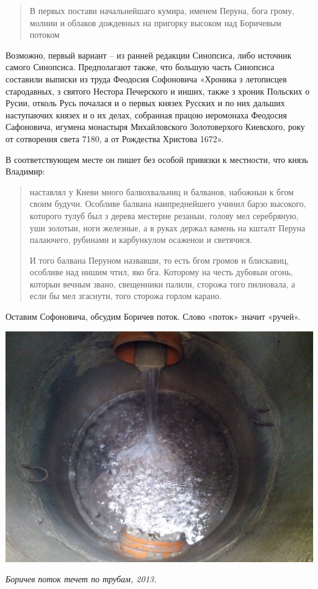 \begin{quotation}
В первых постави начальнейшаго кумира, именем Перуна, бога грому, молнии и облаков дождевных на пригорку высоком над Боричевым потоком
\end{quotation}

Возможно, первый вариант – из ранней редакции Синопсиса, либо источник самого Синопсиса. Предполагают также, что большую часть Синопсиса составили выписки из труда Феодосия Софоновича «Хроника з летописцев стародавных, з святого Нестора Печерского и инших, также з хроник Польских о Русии, отколь Русь почалася и о первых князех Русских и по них дальших наступаючих князех и о их делах, собранная працою иеромонаха Феодосия Сафоновича, игумена монастыря Михайловского Золотоверхого Киевского, року от сотворения света 7180, а от Рождества Христова 1672».

В соответствующем месте он пишет без особой привязки к местности, что князь Владимир:

\begin{quotation}
наставлял у Киеви много балвохвальниц и балванов, набожныи к бгом своим будучи. Особливе балвана наипреднейшего учинил барзо высокого, которого тулуб был з дерева местерне резаныи, голову мел серебряную, уши золотыи, ноги железные, а в руках держал камень на кшталт Перуна палаючего, рубинами и карбункулом осаженои и светячися.

И того балвана Перуном назвавши, то есть бгом громов и блискавиц, особливе над иншим чтил, яко бга. Которому на честь дубовыи огонь, которыи вечным звано, свещенники палили, сторожа того пилновала, а если бы мел згаснути, того сторожа горлом карано.
\end{quotation}

Оставим Софоновича, обсудим Боричев поток. Слово «поток» значит «ручей».

\begin{center}
\includegraphics[width=0.85\linewidth]{chast-colebanie-osnov/borichev-tok/s_borichev-IMG_20131013_150512.jpg}

\textit{Боричев поток течет по трубам, 2013.}
\end{center}

